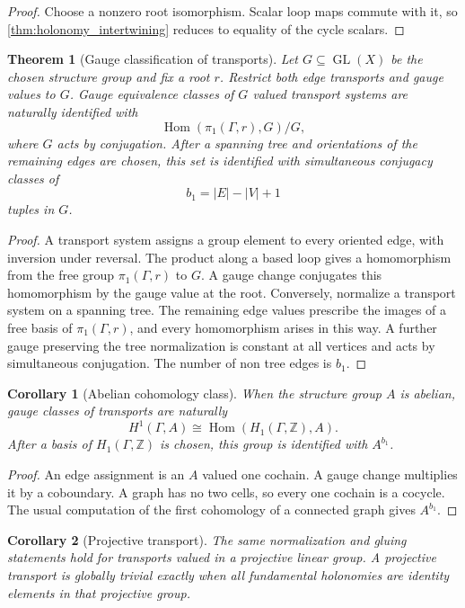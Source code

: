 \documentclass{aomart}
\newtheorem{theorem}{Theorem}[section]
\newtheorem{corollary}[corollary]{Corollary}
\theoremstyle{definition}
\theoremstyle{remark}
\newcommand{\Hom}{\operatorname{Hom}}
\begin{document}
\begin{proof}
Choose a nonzero root isomorphism.  Scalar loop maps commute with it, so \cref{thm:holonomy_intertwining} reduces to equality of the cycle scalars.
\end{proof}

\begin{theorem}[Gauge classification of transports]\label{thm:gauge_classification}
Let $G\subseteq\operatorname{GL}(X)$ be the chosen structure group and fix a root $r$.  Restrict both edge transports and gauge values to $G$.  Gauge equivalence classes of $G$ valued transport systems are naturally identified with
\[
\Hom(\pi_1(\Gamma,r),G)/G,
\]
where $G$ acts by conjugation.  After a spanning tree and orientations of the remaining edges are chosen, this set is identified with simultaneous conjugacy classes of
\[
b_1=|E|-|V|+1
\]
tuples in $G$.
\end{theorem}

\begin{proof}
A transport system assigns a group element to every oriented edge, with inversion under reversal.  The product along a based loop gives a homomorphism from the free group $\pi_1(\Gamma,r)$ to $G$.  A gauge change conjugates this homomorphism by the gauge value at the root.  Conversely, normalize a transport system on a spanning tree.  The remaining edge values prescribe the images of a free basis of $\pi_1(\Gamma,r)$, and every homomorphism arises in this way.  A further gauge preserving the tree normalization is constant at all vertices and acts by simultaneous conjugation.  The number of non tree edges is $b_1$.
\end{proof}

\begin{corollary}[Abelian cohomology class]\label{cor:abelian_holonomy_class}
When the structure group $A$ is abelian, gauge classes of transports are naturally
\[
H^1(\Gamma,A)
\cong
\Hom(H_1(\Gamma,\mathbb Z),A).
\]
After a basis of $H_1(\Gamma,\mathbb Z)$ is chosen, this group is identified with $A^{b_1}$.
\end{corollary}

\begin{proof}
An edge assignment is an $A$ valued one cochain.  A gauge change multiplies it by a coboundary.  A graph has no two cells, so every one cochain is a cocycle.  The usual computation of the first cohomology of a connected graph gives $A^{b_1}$.
\end{proof}

\begin{corollary}[Projective transport]\label{cor:projective_transport}
The same normalization and gluing statements hold for transports valued in a projective linear group.  A projective transport is globally trivial exactly when all fundamental holonomies are identity elements in that projective group.
\end{corollary}
\end{document}

